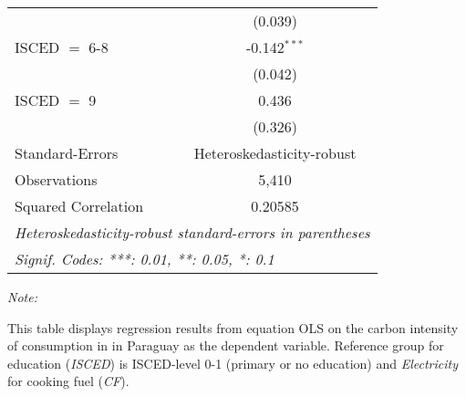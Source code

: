 \begin{table}[htbp!]
\begin{adjustbox}{width = 1\textwidth, max height = 0.95\textheight, center}
\begin{threeparttable}[b]
\begin{tabular}{lc}
                                & (0.039)\\   
            ISCED $=$ 6-8       & -0.142$^{***}$\\   
                                & (0.042)\\   
            ISCED $=$ 9         & 0.436\\   
                                & (0.326)\\   
            \midrule 
            Standard-Errors     & Heteroskedasticity-robust \\   
            Observations        & 5,410\\  
            Squared Correlation & 0.20585\\  
            \midrule \midrule
            \multicolumn{2}{l}{\emph{Heteroskedasticity-robust standard-errors in parentheses}}\\
            \multicolumn{2}{l}{\emph{Signif. Codes: ***: 0.01, **: 0.05, *: 0.1}}\\
         \end{tabular}
         
         \begin{tablenotes}\item \medskip \textit{Note:}
            \item This table displays regression results from equation OLS on the carbon intensity of consumption in  in Paraguay as the dependent variable. Reference group for education (\textit{ISCED}) is ISCED-level 0-1 (primary or no education) and \textit{Electricity} for cooking fuel (\textit{CF}).
         \end{tablenotes}
      \end{threeparttable}
   \end{adjustbox}
\end{table}


